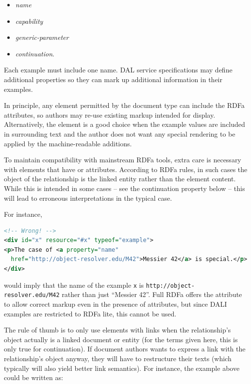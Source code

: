 \documentclass[11pt,letter]{ivoa}
\begin{document}
\begin{itemize}
\item \emph{name}
\item \emph{capability}
\item \emph{generic-parameter}
\item \emph{continuation}.
\end{itemize}

Each example must include one 
name.  DAL service specifications may define additional 
properties so they can mark up additional information in their examples.

In principle, any element permitted by the document type can include the RDFa 
attributes, so authors may re-use existing markup intended for display. 
Alternatively, the  element is a good choice when the example values are 
included in surrounding text and the author does not want any special rendering 
to be applied by the machine-readable additions.

To maintain compatibility with mainstream RDFa tools, extra care is
necessary with elements that have  or 
attributes.  According to RDFa rules, in such cases the object of the
relationship is the linked entity rather than the element content.
While this is intended in some cases -- see the continuation property
below -- this will lead to erroneous interpretations in the typical
case.

For instance,

\begin{lstlisting}[language=XML]
<!-- Wrong! -->
<div id="x" resource="#x" typeof="example">
<p>The case of <a property="name" 
  href="http://object-resolver.edu/M42">Messier 42</a> is special.</p>
</div>
\end{lstlisting}

would imply that the name of the example \texttt{x} is
\nolinkurl{http://object-resolver.edu/M42} rather than just ``Messier
42''.  Full RDFa offers the  attribute to allow correct
markup even in the presence of  attributes, but since DALI
examples are restricted to RDFa lite, this cannot be used.

The rule of thumb is to only use elements with links when the
relationship's object actually is a linked document or entity (for the
terms given here, this is only true for continuation).  If document
authors wants to express a link with the relationship's object anyway,
they will have to restructure their texts (which typically will also
yield better link semantics).  For instance, the example above could be
written as:
\end{document}
